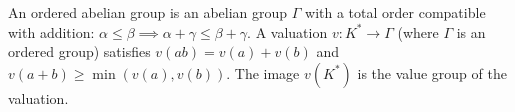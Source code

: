 An ordered abelian group is an abelian group $\Gamma$ with a total order compatible with addition: $\alpha \leq \beta \implies \alpha + \gamma \leq \beta + \gamma$. A valuation $v: K^* \to \Gamma$ (where $\Gamma$ is an ordered group) satisfies $v(ab) = v(a) + v(b)$ and $v(a+b) \geq \min(v(a), v(b))$. The image $v(K^*)$ is the value group of the valuation.
